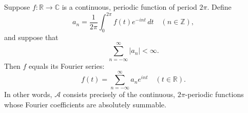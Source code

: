 Suppose $f: \mathbb{R} \to \mathbb{C}$ is a continuous, periodic function of period $2\pi$. Define
$$a_n = \frac{1}{2\pi} \int_0^{2\pi} f(t) e^{-int} \, dt \quad (n \in \mathbb{Z}),$$
and suppose that
$$\sum_{n=-\infty}^{\infty} |a_n| < \infty.$$
Then $f$ equals its Fourier series:
$$f(t) = \sum_{n=-\infty}^{\infty} a_n e^{int} \quad (t \in \mathbb{R}).$$
In other words, $\mathcal{A}$ consists precisely of the continuous, $2\pi$-periodic functions whose Fourier coefficients are absolutely summable.

